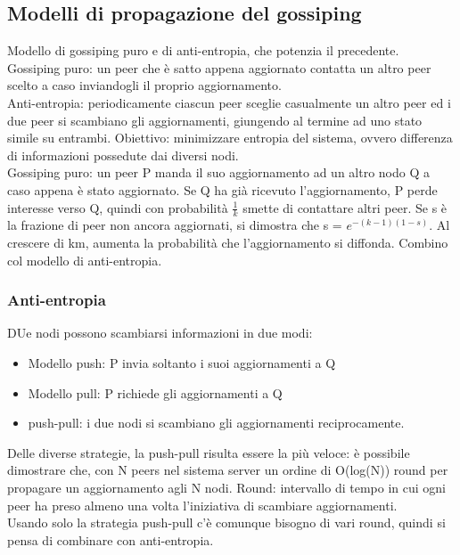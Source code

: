 \documentclass[16px]{article}
\begin{document}
\subsection{Modelli di propagazione del gossiping}
Modello di gossiping puro e di anti-entropia, che potenzia il precedente.\\
Gossiping puro: un peer che è satto appena aggiornato contatta un altro peer scelto a caso inviandogli il proprio aggiornamento.\\ Anti-entropia: periodicamente ciascun peer sceglie casualmente un altro peer ed i due peer si scambiano gli aggiornamenti, giungendo al termine ad uno stato simile su entrambi. Obiettivo: minimizzare entropia del sistema, ovvero differenza di informazioni possedute dai diversi nodi.\\ Gossiping puro: un peer P manda il suo aggiornamento ad un altro nodo Q a caso appena è stato aggiornato. Se Q ha già ricevuto l'aggiornamento, P perde interesse verso Q, quindi con probabilità $\frac{1}{k}$ smette di contattare altri peer. Se s è la frazione di peer non ancora aggiornati, si dimostra che s = $e^{-(k-1)(1-s)}$. Al crescere di km, aumenta la probabilità che l'aggiornamento si diffonda. Combino col modello di anti-entropia.
\subsubsection{Anti-entropia}
DUe nodi possono scambiarsi informazioni in due modi:
\begin{itemize}
\item Modello push: P invia soltanto i suoi aggiornamenti a Q
\item Modello pull: P richiede gli aggiornamenti a Q
\item push-pull: i due nodi si scambiano gli aggiornamenti reciprocamente.
\end{itemize}
Delle diverse strategie, la push-pull risulta essere la più veloce: è possibile dimostrare che, con N peers nel sistema server un ordine di O(log(N)) round per propagare un aggiornamento agli N nodi. Round: intervallo di tempo in cui ogni peer ha preso almeno una volta l'iniziativa di scambiare aggiornamenti.\\ Usando solo la strategia push-pull c'è comunque bisogno di vari round, quindi si pensa di combinare con anti-entropia.
\end{document}
